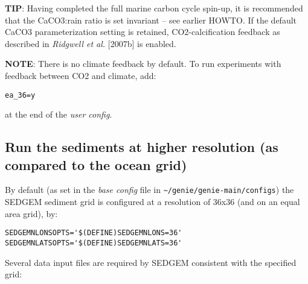 \documentclass[10pt,twoside]{article}
\begin{document}
\noindent \textbf{TIP}: Having completed the full marine carbon cycle spin-up, it is recommended that the CaCO3:rain ratio is set invariant -- see earlier HOWTO. If the default CaCO3 parameterization setting is retained, CO2-calcification feedback as described in \textit{Ridgwell et al.} [2007b] is enabled.

\noindent \textbf{NOTE}: There is no climate feedback by default. To run experiments with feedback between CO2 and climate, add:\vspace{-11pt}\begin{verbatim}ea_36=y\end{verbatim}\vspace{-11pt}
at the end of the \textit{user config}.


\subsection{Run the sediments at higher resolution (as compared to the ocean grid)}\label{Run the sediments at higher resolution}

By default (as set in the \textit{base config} file in \texttt{\~{}/genie/genie-main/configs}) the SEDGEM sediment grid is configured at a resolution of 36x36 (and on an equal area grid), by:
\vspace{-5.5pt}\begin{verbatim}
SEDGEMNLONSOPTS='$(DEFINE)SEDGEMNLONS=36'
SEDGEMNLATSOPTS='$(DEFINE)SEDGEMNLATS=36'
\end{verbatim}\vspace{-5.5pt}
Several data input files are required by SEDGEM consistent with the specified grid:
\end{document}
